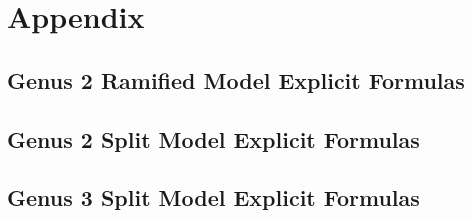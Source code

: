 

\chapter*{Appendix}\label{appendix}
\renewcommand{\thesection}{A.\arabic{section}}

\section{Genus 2 Ramified Model Explicit Formulas }\label{app:g2RAM}
\section{Genus 2 Split Model Explicit Formulas}\label{app:g2SPLIT}
\section{Genus 3 Split Model Explicit Formulas}\label{app:g3SPLIT}




